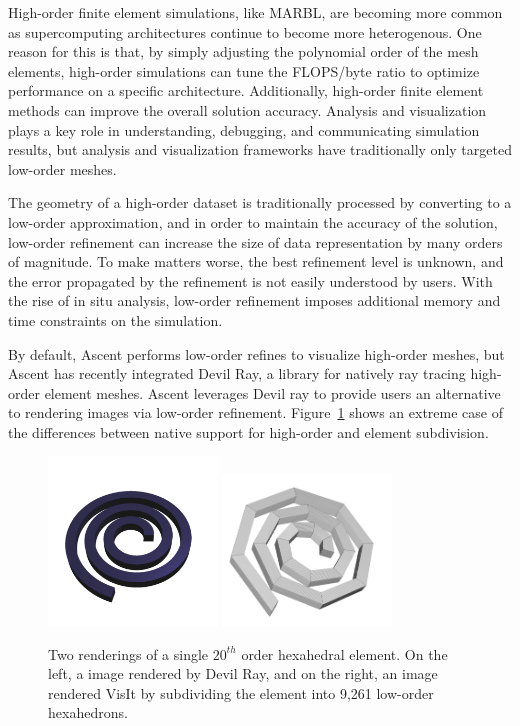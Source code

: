High-order finite element simulations, like MARBL, are becoming more
common as supercomputing architectures continue to become more
heterogenous.
%
One reason for this is that, by simply adjusting the polynomial order
of the mesh elements, high-order simulations
can tune the FLOPS/byte ratio to optimize performance on a specific architecture.
%
Additionally, high-order finite element methods can improve the overall solution accuracy.
%
Analysis and visualization plays a key role in understanding, debugging,
and communicating simulation results, but analysis and visualization frameworks
have traditionally only targeted low-order meshes.
%

The geometry of a high-order dataset is traditionally processed by converting
to a low-order approximation, and in order to maintain the accuracy of
the solution, low-order refinement can increase the size of data representation
by many orders of magnitude.
%
To make matters worse, the best refinement level is unknown,
and the error propagated by the refinement is not easily understood by users.
%
With the rise of in situ analysis, low-order refinement imposes additional memory
and time constraints on the simulation.
%

By default, Ascent performs low-order refines to visualize high-order meshes,
but Ascent has recently integrated Devil Ray, a library for natively ray tracing
high-order element meshes.
%
Ascent leverages Devil ray to provide users an alternative to rendering images via low-order refinement.
%
Figure~\ref{img:crazy_hex} shows an extreme case of the differences between native support for high-order and element subdivision.

\begin{figure}
\centering
\includegraphics[width=0.4\textwidth]{images/dray_crazy}
\includegraphics[width=0.4\textwidth]{images/visit_crazy}
\caption{\label{img:crazy_hex} Two renderings of a single $20^{th}$ order hexahedral element.
On the left, a image rendered by Devil Ray, and on the right, an image rendered VisIt by subdividing the element into
9,261 low-order hexahedrons.}
\end{figure}
